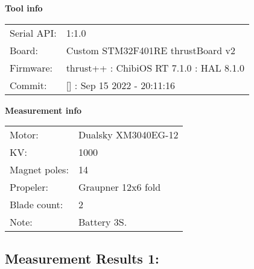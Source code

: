 \documentclass[10pt]{article}
\begin{document}
\noindent
{\large \bf Tool info}
\vspace{3mm}

\noindent
\begin{tabular}{ll}
Serial API:  & 1:1.0\\ 
Board:       & Custom STM32F401RE thrustBoard v2\\ 
Firmware:    & thrust++ : ChibiOS RT 7.1.0 : HAL 8.1.0\\ 
Commit:      & [] : Sep 15 2022 - 20:11:16
\end{tabular}
\vspace{3mm}

\noindent
{\large \bf Measurement info}
\vspace{3mm}

\noindent
\begin{tabular}{ll}
Motor:        & Dualsky XM3040EG-12\\ 
KV:           & 1000\\ 
Magnet poles: & 14\\ 
Propeler:     & Graupner 12x6 fold\\ 
Blade count:  & 2\\ 
Note:         & Battery 3S.
\end{tabular}

\vspace{3mm}


\subsection*{\large \bf Measurement Results 1:}
\end{document}
